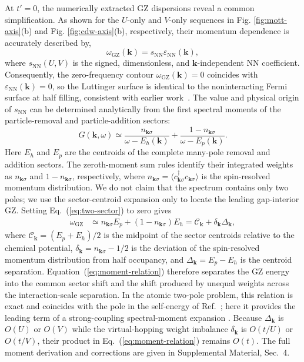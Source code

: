 \documentclass[aps,prl,reprint,superscriptaddress,nofootinbib,longbibliography]{revtex4-1}
\newcommand{\tp}{t'}
\newcommand{\epsk}{\varepsilon_{\mathrm{NN}}(\mathbf{k})}
\newcommand{\wzero}{\omega_{\mathrm{GZ}}}
\newcommand{\disp}[1]{Eq.~(\ref{#1})}
\newcommand{\Disp}[1]{Equation~(\ref{#1})}
\newcommand{\figdisp}[1]{Fig. \ref{#1}}
\begin{document}
At $\tp=0$, the numerically extracted GZ dispersions reveal a common
simplification. As shown for the $U$-only and $V$-only sequences in
\figdisp{fig:mott-axis}(b) and \figdisp{fig:cdw-axis}(b), respectively,
their momentum dependence is accurately described by,
\begin{equation}
  \wzero(\mathbf{k})=s_{\mathrm{NN}}\epsk,
  \label{eq:scale}
\end{equation}
where $s_{\mathrm{NN}}(U,V)$ is the signed, dimensionless, and $\mathbf{k}$-independent NN coefficient. Consequently, the zero-frequency contour $\wzero(\mathbf{k})=0$ coincides with $\epsk=0$, so the Luttinger surface is identical to the noninteracting Fermi surface at half filling, consistent with earlier work~\cite{stanescu2007luttinger}. The value and physical origin of $s_{\mathrm{NN}}$ can be determined analytically from the first spectral moments of the particle-removal and particle-addition sectors:
\begin{equation}
G(\mathbf{k},\omega)\simeq
\frac{n_{\mathbf k\sigma}}{\omega-E_h(\mathbf{k})}
+\frac{1-n_{\mathbf k\sigma}}{\omega-E_p(\mathbf{k})}.
\label{eq:two-sector}
\end{equation}
Here $E_h$ and $E_p$ are the centroids of the complete many-pole removal
and addition sectors. The zeroth-moment sum rules identify their integrated
weights as $n_{\mathbf k\sigma}$ and $1-n_{\mathbf k\sigma}$, respectively,
where $n_{\mathbf k\sigma}=\langle c^\dagger_{\mathbf k\sigma}
c_{\mathbf k\sigma}\rangle$ is the spin-resolved momentum distribution.
We do not claim that the spectrum contains only two poles; we use the
sector-centroid expansion only to locate the leading gap-interior GZ. Setting
\disp{eq:two-sector} to zero gives
\begin{equation}
\begin{aligned}
\wzero &\simeq n_{\mathbf k\sigma}E_p
 +(1-n_{\mathbf k\sigma})E_h=\mathcal C_{\mathbf{k}}+\delta_{\mathbf{k}}\Delta_{\mathbf{k}},
\end{aligned}
\label{eq:moment-relation}
\end{equation}
where $\mathcal C_{\mathbf k}=(E_p+E_h)/2$ is the midpoint of the sector
centroids relative to the chemical potential,
$\delta_{\mathbf k}=n_{\mathbf k\sigma}-1/2$ is the deviation of the
spin-resolved momentum distribution from half occupancy, and
$\Delta_{\mathbf k}=E_p-E_h$ is the centroid separation.
\Disp{eq:moment-relation} therefore separates the GZ energy into
the common sector shift and the shift produced by unequal weights across
the interaction-scale separation.
In the atomic two-pole problem, this relation is exact and coincides with
the pole in the self-energy of Ref.~\cite{dave2013absence}; here it
provides the leading term of a strong-coupling spectral-moment expansion
\cite{harris1967single,pairault2000strong}. Because
$\Delta_{\mathbf k}$ is $O(U)$ or $O(V)$ while the virtual-hopping weight
imbalance $\delta_{\mathbf k}$ is $O(t/U)$ or $O(t/V)$, their product in
\disp{eq:moment-relation} remains $O(t)$. The full moment derivation
and corrections are given in Supplemental Material, Sec.~4.
\end{document}
